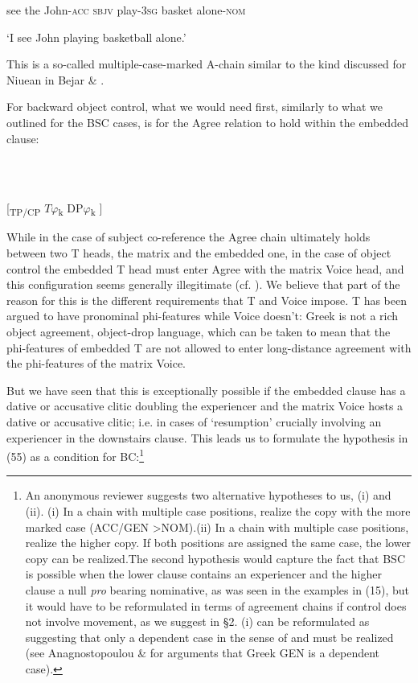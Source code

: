 \documentclass[output=paper]{langsci/langscibook}
\begin{document}
    see     the John-\textsc{acc} \textsc{sbjv} play-\textsc{3sg} basket  alone-\textsc{nom}

\begin{stylePlainText}
  ‘I see John playing basketball alone.’
\end{stylePlainText}

\begin{stylePlainText}
This is a so-called multiple-case-marked A-chain similar to the kind discussed for Niuean in Bejar \& \citet[67]{Massam1999}.
\end{stylePlainText}

  For backward object control, what we would need first, similarly to what we outlined for the BSC cases, is for the Agree relation to hold within the embedded clause:

\ea%
    \label{ex:key:54}
    \gll\\
        \\
    \glt
    \z

          \textsubscript{} [\textsubscript{TP/CP}    $T\varphi $\textsubscript{k}    DP$\varphi $\textsubscript{k}  ]  

While in the case of subject co-reference the Agree chain ultimately holds between two T heads, the matrix and the embedded one, in the case of object control the embedded T head must enter Agree with the matrix Voice head, and this configuration seems generally illegitimate (cf. \citealt{Kayne1989}). We believe that part of the reason for this is the different requirements that T and Voice impose. T has been argued to have pronominal phi-features while Voice doesn’t: Greek is not a rich object agreement, object-drop language, which can be taken to mean that the phi-features of embedded T are not allowed to enter long-distance agreement with the phi-features of the matrix Voice. 

  But we have seen that this is exceptionally possible if the embedded clause has a dative or accusative clitic doubling the experiencer and the matrix Voice hosts a dative or accusative clitic; i.e. in cases of ‘resumption’ crucially involving an experiencer in the downstairs clause. This leads us to formulate the hypothesis in (55) as a condition for BC:\footnote{An anonymous reviewer suggests two alternative hypotheses to us, (i) and (ii). (i)  In a chain with multiple case positions, realize the copy with the more marked case (ACC/GEN >NOM).(ii)  In a chain with multiple case positions, realize the higher copy. If both positions are assigned the same   case, the lower copy can be realized.The second hypothesis would capture the fact that BSC is possible when the lower clause contains an experiencer and the higher clause a null \textit{pro} bearing nominative, as was seen in the examples in (15), but it would have to be reformulated in terms of agreement chains if control does not involve movement, as we suggest in §2. (i) can be reformulated as suggesting that only a dependent case in the sense of \citet{Marantz1991} and \citet{Baker2015} must be realized (see Anagnostopoulou \& \citealt{Sevdali2017} for arguments that Greek GEN is a dependent case).}
\end{document}
